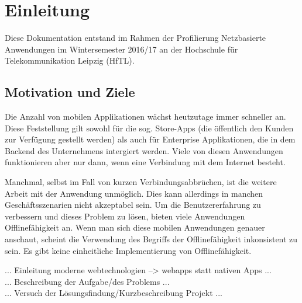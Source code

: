 \chapter{Einleitung}

Diese Dokumentation entstand im Rahmen der Profilierung \glqq Netzbasierte Anwendungen\grqq{} im Wintersemester 2016/17 an der Hochschule für Telekommunikation Leipzig (HfTL).


\section{Motivation und Ziele}
\label{sec_einleitung_motivation-ziele}

Die Anzahl von mobilen Applikationen wächst heutzutage immer schneller an. Diese Feststellung gilt sowohl für die sog. Store-Apps (die öffentlich den Kunden zur Verfügung gestellt werden) als auch für Enterprise Applikationen, die in dem Backend des Unternehmens intergiert werden. Viele von diesen Anwendungen funktionieren aber nur dann, wenn eine Verbindung mit dem Internet besteht.

Manchmal, selbst im Fall von kurzen Verbindungsabbrüchen, ist die weitere Arbeit mit der Anwendung unmöglich. Dies kann allerdings in manchen Geschäftsszenarien nicht akzeptabel sein. Um die Benutzererfahrung zu verbessern und dieses Problem zu lösen, bieten viele Anwendungen Offlinefähigkeit an. Wenn man sich diese mobilen Anwendungen genauer anschaut, scheint die Verwendung des Begriffs der Offlinefähigkeit inkonsistent zu sein. Es gibt keine einheitliche Implementierung von Offlinefähigkeit. 


... Einleitung moderne webtechnologien --> webapps statt nativen Apps ... \\
... Beschreibung der Aufgabe/des Problems ...\\

... Versuch der Lösungsfindung/Kurzbeschreibung Projekt ... \\

